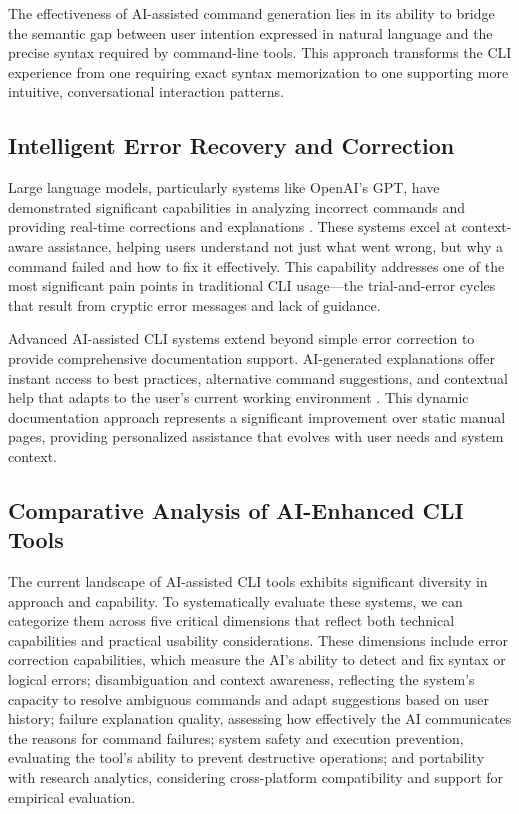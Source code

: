 The effectiveness of AI-assisted command generation lies in its ability to bridge the semantic gap between user intention expressed in natural language and the precise syntax required by command-line tools. This approach transforms the CLI experience from one requiring exact syntax memorization to one supporting more intuitive, conversational interaction patterns.

\subsection{Intelligent Error Recovery and Correction}

Large language models, particularly systems like OpenAI's GPT, have demonstrated significant capabilities in analyzing incorrect commands and providing real-time corrections and explanations \cite{spinellis2023}. These systems excel at context-aware assistance, helping users understand not just what went wrong, but why a command failed and how to fix it effectively. This capability addresses one of the most significant pain points in traditional CLI usage—the trial-and-error cycles that result from cryptic error messages and lack of guidance.

Advanced AI-assisted CLI systems extend beyond simple error correction to provide comprehensive documentation support. AI-generated explanations offer instant access to best practices, alternative command suggestions, and contextual help that adapts to the user's current working environment \cite{cli2023}. This dynamic documentation approach represents a significant improvement over static manual pages, providing personalized assistance that evolves with user needs and system context.

\subsection{Comparative Analysis of AI-Enhanced CLI Tools}

The current landscape of AI-assisted CLI tools exhibits significant diversity in approach and capability. To systematically evaluate these systems, we can categorize them across five critical dimensions that reflect both technical capabilities and practical usability considerations. These dimensions include error correction capabilities, which measure the AI's ability to detect and fix syntax or logical errors; disambiguation and context awareness, reflecting the system's capacity to resolve ambiguous commands and adapt suggestions based on user history; failure explanation quality, assessing how effectively the AI communicates the reasons for command failures; system safety and execution prevention, evaluating the tool's ability to prevent destructive operations; and portability with research analytics, considering cross-platform compatibility and support for empirical evaluation.

